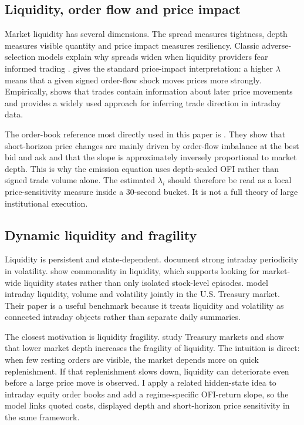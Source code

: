 \documentclass[12pt,a4paper]{article}
\begin{document}
\subsection{Liquidity, order flow  and price impact}\label{sec:literature_liquidity}

Market liquidity has several dimensions. The spread measures tightness, depth measures visible quantity  and price impact measures resiliency. Classic adverse-selection models explain why spreads widen when liquidity providers fear informed trading \citep{GlostenMilgrom1985,EasleyOHara1992}. \citet{Kyle1985} gives the standard price-impact interpretation: a higher \(\lambda\) means that a given signed order-flow shock moves prices more strongly. Empirically, \citet{Hasbrouck1991} shows that trades contain information about later price movements  and \citet{LeeReady1991} provides a widely used approach for inferring trade direction in intraday data.

The order-book reference most directly used in this paper is \citet{ContKukanovStoikov2014}. They show that short-horizon price changes are mainly driven by order-flow imbalance at the best bid and ask  and that the slope is approximately inversely proportional to market depth. This is why the emission equation uses depth-scaled OFI rather than signed trade volume alone. The estimated \(\lambda_i\) should therefore be read as a local price-sensitivity measure inside a 30-second bucket. It is not a full theory of large institutional execution.

\subsection{Dynamic liquidity and fragility}\label{sec:literature_fragility}

Liquidity is persistent and state-dependent. \citet{AndersenBollerslev1997} document strong intraday periodicity in volatility. \citet{ChordiaRollSubrahmanyam2000} show commonality in liquidity, which supports looking for market-wide liquidity states rather than only isolated stock-level episodes. \citet{NguyenEngleFlemingGhysels2020} model intraday liquidity, volume  and volatility jointly in the U.S. Treasury market. Their paper is a useful benchmark because it treats liquidity and volatility as connected intraday objects rather than separate daily summaries.

The closest motivation is liquidity fragility. \citet{MeldrumSokolinskiy2025} study Treasury markets and show that lower market depth increases the fragility of liquidity. The intuition is direct: when few resting orders are visible, the market depends more on quick replenishment. If that replenishment slows down, liquidity can deteriorate even before a large price move is observed. I apply a related hidden-state idea to intraday equity order books and add a regime-specific OFI-return slope, so the model links quoted costs, displayed depth  and short-horizon price sensitivity in the same framework.
\end{document}
